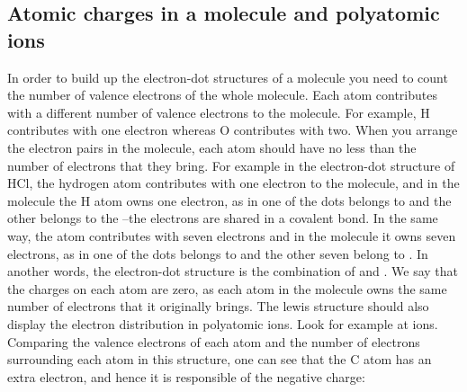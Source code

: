 \documentclass[main.tex]{subfiles}
\begin{document}
\subsection*{Atomic charges in a molecule and polyatomic ions}
In order to build up the electron-dot structures of a molecule you need to count the number of valence electrons of the whole molecule. Each atom contributes with a different number of valence electrons to the molecule. For example, H contributes with one electron whereas O contributes with two. When you arrange the electron pairs in the molecule, each atom should have no less than the number of electrons that they bring. For example in the electron-dot structure of HCl, \hspace{.05in}\hspace{.05in} the hydrogen atom contributes with one electron to the molecule, and in the molecule the H atom owns one electron, as in \hspace{.05in}  one of the dots belongs to  and the other belongs to the --the electrons are shared in a covalent bond. In the same way, the  atom contributes with seven electrons and in the molecule it owns seven electrons, as in \hspace{.05in} one of the dots belongs to  and the other seven belong to . In another words, the \hspace{.05in}\hspace{.05in} electron-dot structure is the combination of \hspace{.05in} and \hspace{.05in}\hspace{.05in}. We say that the charges on each atom are zero, as each atom in the molecule owns the same number of electrons that it originally brings. The lewis structure should also display the electron distribution in polyatomic ions. Look for example at  ions. Comparing the valence electrons of each atom and the number of electrons surrounding each atom in this structure, one can see that the C atom has an extra electron, and hence it is responsible of the negative charge:
\begin{center}
\end{center}
\end{document}
